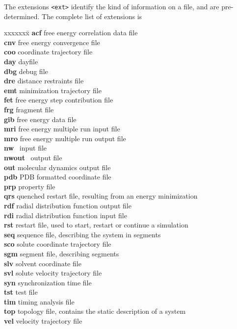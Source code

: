 The extensions \verb+<ext>+ identify the kind of information on a file,
and are pre-determined. 
The complete list of extensions is
\begin{tabbing}
xxxxxxx\=\kill
{\bf acf} \> free energy correlation data file\\
{\bf cnv} \> free energy convergence file\\
{\bf coo} \> coordinate trajectory file\\
{\bf day} \> dayfile\\
{\bf dbg} \> debug file\\
{\bf dre} \> distance restraints file\\
{\bf emt} \> minimization trajectory file\\
{\bf fet} \> free energy step contribution file\\
{\bf frg} \> fragment file\\
{\bf gib} \> free energy data file\\
{\bf mri} \> free energy multiple run input file\\
{\bf mro} \> free energy multiple run output file\\
{\bf nw}  \> \nwchem\ input file\\
{\bf nwout}  \> \nwchem\ output file\\
{\bf out} \> molecular dynamics output file\\
{\bf pdb} \> PDB formatted coordinate file\\
{\bf prp} \> property file\\
{\bf qrs} \> quenched restart file, resulting from an energy minimization\\
{\bf rdf} \> radial distribution function output file\\
{\bf rdi} \> radial distribution function input file\\
{\bf rst} \> restart file, used to start, restart or continue a simulation \\
{\bf seq} \> sequence file, describing the system in segments\\
{\bf sco} \> solute coordinate trajectory file\\
{\bf sgm} \> segment file, describing segments\\
{\bf slv} \> solvent coordinate file\\
{\bf svl} \> solute velocity trajectory file\\
{\bf syn} \> synchronization time file\\
{\bf tst} \> test file\\
{\bf tim} \> timing analysis file\\
{\bf top} \> topology file, contains the static description of a system\\
{\bf vel} \> velocity trajectory file\\
\end{tabbing}

